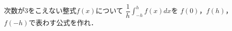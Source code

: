 \documentclass[../../main.tex]{subfiles}
\begin{document}
次数が3をこえない整式$f(x)$について
$\displaystyle\dfrac{1}{h}\int_{-h}^hf(x)dx$を
$f(0)$，$f(h)$，$f(-h)$で表わす公式を作れ．
\end{document}
